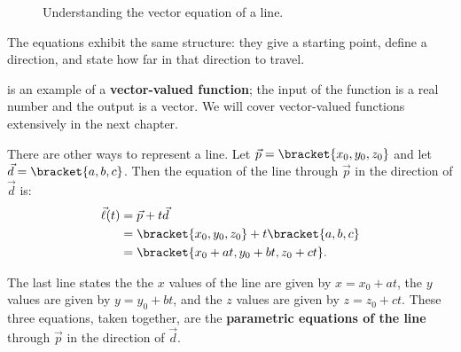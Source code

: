 \begin{figure}[!hb]
\centering
{}
\captionsetup{type=figure}%
\caption{Understanding the vector equation of a line.}
\label{fig:lines_eq}
\end{figure}

The equations exhibit the same structure: they give a starting point, define a direction, and state how far in that direction to travel.

 is an example of a \textbf{vector-valued function}; the input of the function is a real number and the output is a vector. We will cover vector-valued functions extensively in the next chapter.

There are other ways to represent a line. Let $\vec p =\bracket{x_0,y_0,z_0}$ and let $\vec d =\bracket{a,b,c}$. Then the equation of the line through $\vec p$ in the direction of $\vec d$ is:
\begin{align*}
\vec\ell(t) &= \vec p + t\vec d \\
						&=\bracket{x_0,y_0,z_0}+ t\bracket{a,b,c}\\
						&=\bracket{x_0 + at, y_0+bt, z_0+ct}.
\end{align*}

The last line states the the $x$ values of the line are given by $x=x_0+at$, the $y$ values are given by $y = y_0+bt$, and the $z$ values are given by $z = z_0 + ct$. These three equations, taken together, are the \textbf{parametric equations of the line} through $\vec p$ in the direction of $\vec d$.

